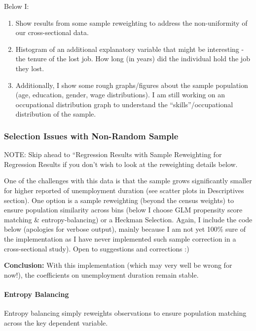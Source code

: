 \documentclass[
]{article}
\providecommand{\tightlist}{%
  \setlength{\itemsep}{0pt}\setlength{\parskip}{0pt}}
\begin{document}
Below I:

\begin{enumerate}
\def\labelenumi{\arabic{enumi}.}
\tightlist
\item
  Show results from some sample reweighting to address the
  non-uniformity of our cross-sectional data.
\item
  Histogram of an additional explanatory variable that might be
  interesting - the tenure of the lost job. How long (in years) did the
  individual hold the job they lost.
\item
  Additionally, I show some rough graphs/figures about the sample
  population (age, education, gender, wage distributions). I am still
  working on an occupational distribution graph to understand the
  ``skills''/occupational distribution of the sample.
\end{enumerate}

\subsubsection{Selection Issues with Non-Random
Sample}\label{selection-issues-with-non-random-sample}

NOTE: Skip ahead to ``Regression Results with Sample Reweighting for
Regression Results if you don't wish to look at the reweighting details
below.

One of the challenges with this data is that the sample grows
significantly smaller for higher reported of unemployment duration (see
scatter plots in Descriptives section). One option is a sample
reweighting (beyond the census weights) to ensure population similarity
across bins (below I choose GLM propensity score matching \&
entropy-balancing) or a Heckman Selection. Again, I include the code
below (apologies for verbose output), mainly because I am not yet 100\%
sure of the implementation as I have never implemented such sample
correction in a cross-sectional study). Open to suggestions and
corrections :)

\textbf{Conclusion:} With this implementation (which may very well be
wrong for now!), the coefficients on unemployment duration remain
stable.

\paragraph{Entropy Balancing}\label{entropy-balancing}

Entropy balancing simply reweights observations to ensure population
matching across the key dependent variable.
\end{document}
